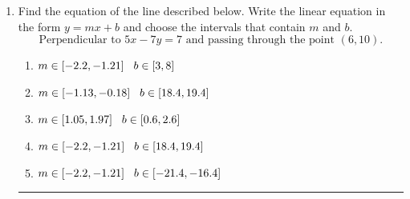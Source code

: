 \documentclass[14pt]{extbook}
\newcommand{\litem}[1]{\item#1\hspace*{-1cm}\rule{\textwidth}{0.4pt}}
\begin{document}
\begin{enumerate}
{\begin{enumerate}[label=\Alph*.]
\end{enumerate} }
\litem{
Find the equation of the line described below. Write the linear equation in the form $ y=mx+b $ and choose the intervals that contain $m$ and $b$.\[ \text{Perpendicular to } 5 x - 7 y = 7 \text{ and passing through the point } (6, 10). \]\begin{enumerate}[label=\Alph*.]
\item \( m \in [-2.2, -1.21] \hspace*{3mm} b \in [3, 8] \)
\item \( m \in [-1.13, -0.18] \hspace*{3mm} b \in [18.4, 19.4] \)
\item \( m \in [1.05, 1.97] \hspace*{3mm} b \in [0.6, 2.6] \)
\item \( m \in [-2.2, -1.21] \hspace*{3mm} b \in [18.4, 19.4] \)
\item \( m \in [-2.2, -1.21] \hspace*{3mm} b \in [-21.4, -16.4] \)

\end{enumerate} }
\end{enumerate}
\end{document}
